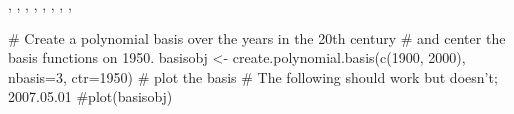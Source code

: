 \documentclass{article}
\begin{document}
\begin{SeeAlso}\relax
{},
,
,
,
,
,
,
,
\end{SeeAlso}
\begin{Examples}
\begin{ExampleCode}
#  Create a polynomial basis over the years in the 20th century
#  and center the basis functions on 1950.
basisobj <- create.polynomial.basis(c(1900, 2000), nbasis=3, ctr=1950)
#  plot the basis
# The following should work but doesn't;  2007.05.01
#plot(basisobj)
\end{ExampleCode}
\end{Examples}
\end{document}
